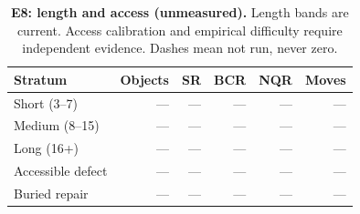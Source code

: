 \begin{table}[!ht]
\centering\small
\caption{\textbf{E8: length and access (unmeasured).} Length bands are current. Access calibration and empirical difficulty require independent evidence. Dashes mean not run, never zero.}
\begin{tabularx}{\textwidth}{@{}Xrrrrr@{}}\toprule
Stratum & Objects & SR & BCR & NQR & Moves\\\midrule
Short (3--7) & --- & --- & --- & --- & ---\\
Medium (8--15) & --- & --- & --- & --- & ---\\
Long (16+) & --- & --- & --- & --- & ---\\
Accessible defect & --- & --- & --- & --- & ---\\
Buried repair & --- & --- & --- & --- & ---\\
\bottomrule
\end{tabularx}
\end{table}
